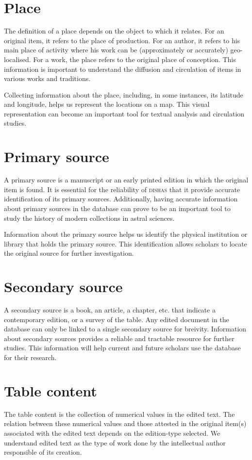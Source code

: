 \documentclass[a4paper,12pt,twoside]{book}
\begin{document}
		\section{Place}
	The definition of a place depends on the object to which it relates. For an original item, it refers to the place of production. For an author, it refers to his main place of activity where his work can be (approximately or accurately) geo-localised. For a work, the place refers to the original place of conception. This information is important to understand the diffusion and circulation of items in various works and traditions.
	
	Collecting information about the place, including, in some instances, its latitude and longitude, helps us represent the locations on a map. This visual representation can become an important tool for textual analysis and circulation studies.
	
		\section{Primary source}
	A primary source is a manuscript or an early printed edition in which the original item is found. It is essential for the reliability of \textsc{dishas} that it provide accurate identification of its primary sources. Additionally, having accurate information about primary sources in the database can prove to be an important tool to study the history of modern collections in astral sciences.
	
	Information about the primary source helps us identify the physical institution or library that holds the primary source. This identification allows scholars to locate the original source for further investigation.
	
		\section{Secondary source}
	A secondary source is a book, an article, a chapter, etc. that indicate a contemporary edition, or a survey of the table. Any edited document in the database can only be linked to a single secondary source for breivity. Information about secondary sources provides a reliable and tractable resource for further studies. This information will help current and future scholars use the database for their research.
	
		\section{Table content}
	The table content is the collection of numerical values in the edited text. The relation between these numerical values and those attested in the original item(s) associated with the edited text depends on the edition-type selected. We understand edited text as the type of work done by the intellectual author responsible of its creation.
	
\end{document}
